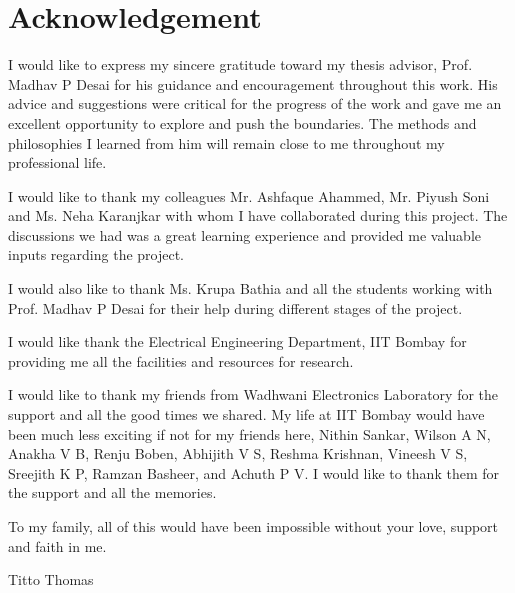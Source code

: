 
\chapter*{Acknowledgement}

I would like to express my sincere gratitude toward my thesis advisor, Prof. Madhav P Desai for his guidance and encouragement throughout this work. His advice and suggestions were critical for the progress of the work and gave me an excellent opportunity to explore and push the boundaries. The methods and philosophies I learned from him will remain close to me throughout my professional life.


I would like to thank my colleagues Mr. Ashfaque Ahammed, Mr. Piyush Soni and Ms. Neha Karanjkar with whom I have collaborated during this project. The discussions we had was a great learning experience and provided me valuable inputs regarding the project.

I would also like to thank Ms. Krupa Bathia and all the students working with Prof. Madhav P Desai for their help during different stages of the project.


I would like thank the Electrical Engineering Department, IIT Bombay for providing me all the facilities and resources for research.

I would like to thank my friends from Wadhwani Electronics Laboratory for the support and all the good times we shared. My life at IIT Bombay would have been much less exciting if not for my friends here, Nithin Sankar, Wilson A N, Anakha V B, Renju Boben, Abhijith V S, Reshma Krishnan, Vineesh V S, Sreejith K P, Ramzan Basheer, and Achuth P V. I would like to thank them for the support and all the memories.

To my family, all of this would have been impossible without your love, support and faith in me.
\vspace{0.5cm}

\hspace{11cm}Titto Thomas


\thispagestyle{titlepages}

